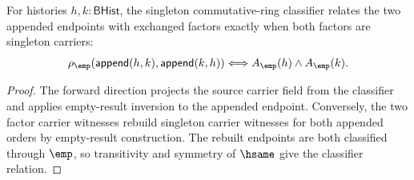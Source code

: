 \begin{theorem}
\label{thm:commring-singleton-classifier-append-comm-carrier-iff}
For histories $h,k:\mathsf{BHist}$, the singleton commutative-ring classifier
relates the two appended endpoints with exchanged factors exactly when both
factors are singleton carriers:
$$
\rho_{\emp}(\mathsf{append}(h,k),\mathsf{append}(k,h))
\Longleftrightarrow
A_{\emp}(h)\land A_{\emp}(k).
$$
\end{theorem}
\begin{proof}
The forward direction projects the source carrier field from the classifier
and applies empty-result inversion to the appended endpoint. Conversely, the
two factor carrier witnesses rebuild singleton carrier witnesses for both
appended orders by empty-result construction. The rebuilt endpoints are both
classified through $\emp$, so transitivity and symmetry of $\hsame$ give the
classifier relation.
\end{proof}

